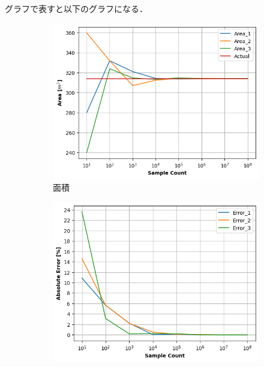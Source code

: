 \documentclass[a4j, titlepage]{jarticle}
\begin{document}
        グラフで表すと以下のグラフになる．
        \begin{figure}[htb]
          \begin{subfigure}[b]{0.38\textwidth}
              \centering
              \includegraphics[height=\textwidth]{../Dir_Area/img_area10.png}
              \caption{面積}
              \label{fig:area10}
          \end{subfigure}
          \hspace{50pt}
          \begin{subfigure}[b]{0.38\textwidth}
            \includegraphics[height=\textwidth]{../Dir_Area/img_error10.png}

\end{subfigure}
\end{figure}
\end{document}
